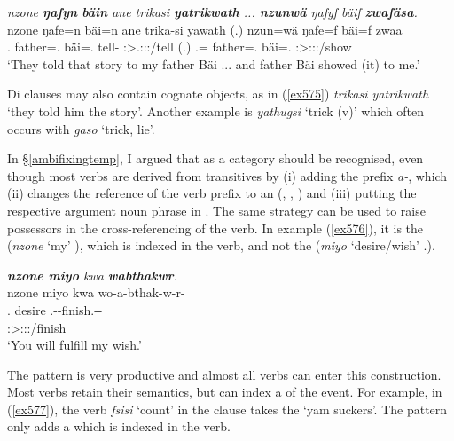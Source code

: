 \begin{exe}
	\ex \emph{nzone \textbf{ŋafyn} \textbf{bäin} ane trikasi \textbf{yatrikwath} ... \textbf{nzunwä} ŋafyf bäif \textbf{zwafäsa}.}\\
	\gll nzone ŋafe=n bäi=n ane trika-si yawath (.) nzun=wä ŋafe=f bäi=f zwaa\\
	\Fsg.\Poss{} father=\Dat.\Sg{} bäi=\Dat.\Sg{} \Dem{} tell-\Nmlz{} \Stpl:\Sbj>\Tsg.\Masc:\Io:\Pst:\Ipfv/tell (.) \Fsg.\Dat=\Emph{} father=\Erg.\Sg{} bäi=\Erg.\Sg{} \Stsg:\Sbj>\Fsg:\Io:\Pst:\Pfv/show\\
	\trans `They told that story to my father Bäi ... and father Bäi showed (it) to me.'\\
	\label{ex575}
\end{exe}

Di clauses may also contain cognate objects, as in (\ref{ex575}) \emph{trikasi yatrikwath} `they told him the story'. Another example is \emph{yathugsi} `trick (v)' which often occurs with \emph{gaso} `trick, lie'.%

In \S{}\ref{ambifixingtemp}, I argued that  as a category should be recognised, even though most  verbs are derived from transitives by (i) adding the  prefix \emph{a-}, which (ii) changes the reference of the verb prefix to an  (, , ) and (iii) putting the respective argument noun phrase in  . The same strategy can be used to raise possessors in the cross-referencing of the verb. In example (\ref{ex576}), it is the  (\emph{nzone} `my' \Fsg), which is indexed in the verb, and not the  (\emph{miyo} `desire/wish' \Tsg.\F).

\begin{exe}
	\ex \emph{\textbf{nzone miyo} kwa \textbf{wabthakwr}.}\\
	\glll nzone miyo kwa wo-a-bthak-w-r-\Zero{}\\
	\Fsg.\Poss{} desire \Fut{} \Fsg.\Alph-\Vc-finish.\Ext-\Lk-\Stsg{}\\
	{} {} {} \footnotesize{\Stsg:\Sbj>\Fsg:\Io:\Nonpast:\Ipfv/finish}\\
	\trans `You will fulfill my wish.'
	\label{ex576}
\end{exe}

The  pattern is very productive and almost all  verbs can enter this construction. Most verbs retain their  semantics, but can index a  of the event. For example, in (\ref{ex577}), the verb \emph{fsisi} `count' in the clause takes the  `yam suckers'. The  pattern only adds a  which is indexed in the verb.

